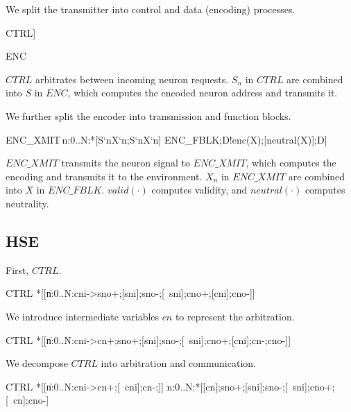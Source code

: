\documentclass{article}
\begin{document}
We split the transmitter into control and data (encoding) processes. 

\begin{csp}
CTRL\equiv*[[\langle\|n:0..N\-1:#{C`n}->S`n;S`n;C`n;C`n\rangle]]
\end{csp}

\begin{csp}
ENC
\end{csp}

\noindent $CTRL$ arbitrates between incoming neuron requests. $S_n$ in $CTRL$ are combined into $S$ in $ENC$, which computes the encoded neuron address and transmits it.

We further split the encoder into transmission and function blocks.

\begin{csp}
ENC_XMIT\equiv\langle\pll\,n:0..N:*[S`n\star\!X`n;S`n\star\!X`n]\rangle
ENC_FBLK\equiv*[[valid(X)];D!enc(X);[neutral(X)];D]
\end{csp}

\noindent $ENC\_XMIT$ transmits the neuron signal to $ENC\_XMIT$, which computes the encoding and transmits it to the environment. $X_n$ in $ENC\_XMIT$ are combined into $X$ in $ENC\_FBLK$. $valid(\cdot)$ computes validity, and $neutral(\cdot)$ computes neutrality.

\subsection{HSE}

First, $CTRL$.

\begin{hse}
CTRL\equiv
*[[\langle\|n:0..N:cni->sno+;[sni];sno-;[~sni];cno+;[cni];cno-\rangle]]
\end{hse}

We introduce intermediate variables $cn$ to represent the arbitration.

\begin{hse}
CTRL\equiv
*[[\langle\|n:0..N:cni->cn+;sno+;[sni];sno-;[~sni];cno+;[cni];cn-;cno-\rangle]]
\end{hse}

We decompose $CTRL$ into arbitration and communication.

\begin{hse}
CTRL\equiv
*[[\langle\|n:0..N:cni->cn+;[~cni];cn-;\rangle]] \pll
\langle\pll\!n:0..N:*[[cn];sno+;[sni];sno-;[~sni];cno+;[~cn];cno-]\rangle
\end{hse}
\end{document}
